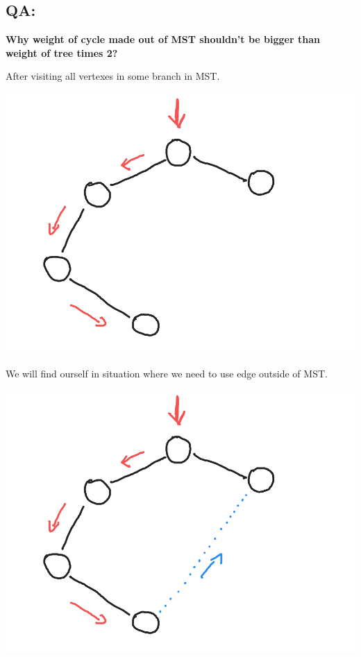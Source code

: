 \documentclass{article}
\begin{document}
\subsection*{QA:}
\begin{center}
    \textbf{Why weight of cycle made out of MST shouldn't be bigger than weight of tree times 2?}
\end{center}
After visiting all vertexes in some branch in MST.
\begin{center}
    \includegraphics[scale=0.14]{1} 
\end{center}
We will find ourself in situation where we need to use edge outside of MST.
\begin{center}
    \includegraphics[scale=0.14]{2} 
\end{center}
\end{document}
